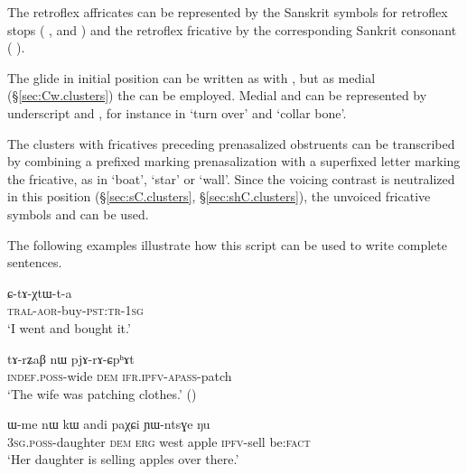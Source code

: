 The retroflex affricates can be represented by the Sanskrit symbols for retroflex stops ( ,   and  ) and the retroflex fricative by the corresponding Sankrit consonant (  ).


The glide  in initial position can be written as   with , but as medial (§\ref{sec:Cw.clusters}) the  can be employed. Medial  and  can be represented by underscript  and , for instance in  `turn over' and  `collar bone'.

The clusters with fricatives preceding prenasalized obstruents can be transcribed by combining a prefixed {} marking prenasalization with a superfixed letter marking the fricative, as in  `boat',   `star' or  `wall'. Since the voicing contrast is neutralized in this position (§\ref{sec:sC.clusters}, §\ref{sec:shC.clusters}), the unvoiced fricative symbols  and  can be used.

The following examples illustrate how this script can be used to write complete sentences. 

\begin{exe}
	\ex 
	\gll ɕ-tɤ-χtɯ-t-a \\
	\textsc{tral}-\textsc{aor}-buy-\textsc{pst}:\textsc{tr}-\textsc{1sg} \\
	\glt {} 
	\glt `I went and bought it.' 
\end{exe}

\begin{exe}
	\ex 
	\gll  tɤ-rʑaβ nɯ pjɤ-rɤ-ɕpʰɤt \\
	\textsc{indef}.\textsc{poss}-wide \textsc{dem} \textsc{ifr}.\textsc{ipfv}-\textsc{apass}-patch \\
	\glt {}
	\glt `The wife was patching clothes.' 
	()
\end{exe}


\begin{exe}
	\ex 
	\gll  ɯ-me nɯ kɯ andi paχɕi ɲɯ-ntsɣe ŋu\\
	\textsc{3sg}.\textsc{poss}-daughter \textsc{dem} \textsc{erg} west apple \textsc{ipfv}-sell be:\textsc{fact} \\
	\glt {}
	\glt `Her daughter is selling apples over there.' 
\end{exe}

